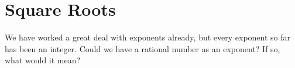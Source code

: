 %
%
%
%
%
%
%
%
%
%
%
%
%


\section{Square Roots}
\label{sec:radsquareroots}

We have worked a great deal with exponents already, but every exponent so far has been an integer. Could we have a rational number as an exponent? If so, what would it mean?

